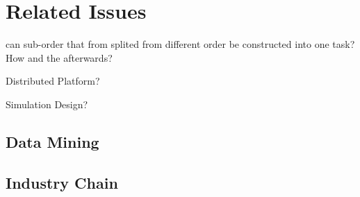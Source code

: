 \section{Related Issues} %
\label{sec:problem}

can sub-order that from splited from different order be constructed into one task? How and the afterwards?

Distributed Platform?

Simulation Design?

\subsection{Data Mining} %
\label{sub:data_mining}


\subsection{Industry Chain} %
\label{sub:industry_chain}

